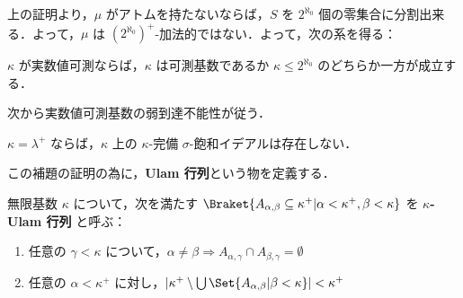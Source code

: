 \documentclass[a4j,uplatex]{jsarticle}
\begin{document}
上の証明より，$\mu$ がアトムを持たないならば，$S$ を $2^{\aleph_0}$ 個の零集合に分割出来る．よって，$\mu$ は $(2^{\aleph_0})^+$-加法的ではない．よって，次の系を得る：

\begin{corollary}
 $\kappa$ が実数値可測ならば，$\kappa$ は可測基数であるか $\kappa \leq 2^{\aleph_0}$ のどちらか一方が成立する．
\end{corollary}

次から実数値可測基数の弱到達不能性が従う．

\begin{lemma}
 $\kappa = \lambda^+$ ならば，$\kappa$ 上の $\kappa$-完備 $\sigma$-飽和イデアルは存在しない．
\end{lemma}

この補題の証明の為に，{\bfseries Ulam 行列}という物を定義する．

\begin{definition}[Ulam 行列]
 無限基数 $\kappa$ について，次を満たす $\Braket{A_{\alpha, \beta} \subseteq \kappa^+ | \alpha < \kappa^+, \beta < \kappa }$ を {\bfseries $\kappa$-Ulam 行列} と呼ぶ：
 \begin{enumerate}[label=(\roman*)]
 \item 任意の $\gamma < \kappa$ について，$\alpha \neq \beta \Rightarrow A_{\alpha,\gamma} \cap A_{\beta, \gamma} = \emptyset$
 \item 任意の $\alpha < \kappa^+$ に対し，$\left|\kappa^+ \setminus \bigcup\Set{A_{\alpha, \beta} | \beta < \kappa}\right| < \kappa^+$
 \end{enumerate}
\end{definition}
\end{document}

